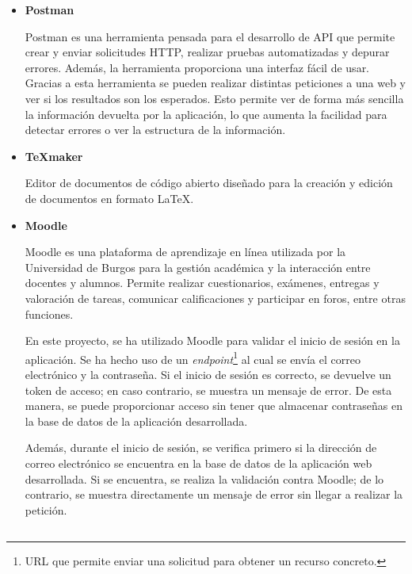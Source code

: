 \begin{itemize}
\item\textbf{Postman}

Postman es una herramienta pensada para el desarrollo de API que permite crear y enviar solicitudes HTTP, realizar pruebas automatizadas y depurar errores.
Además, la herramienta proporciona una interfaz fácil de usar.
Gracias a esta herramienta se pueden realizar distintas peticiones a una web y ver si los resultados son los esperados.
Esto permite ver de forma más sencilla la información devuelta por la aplicación, lo que aumenta la facilidad para detectar errores o ver la estructura de la información.

\item\textbf{\TeX{}maker}

Editor de documentos de código abierto diseñado para la creación y edición de documentos en formato \LaTeX.

\item\textbf{Moodle}

Moodle es una plataforma de aprendizaje en línea utilizada por la Universidad de Burgos para la gestión académica y la interacción entre docentes y alumnos. Permite realizar cuestionarios, exámenes, entregas y valoración de tareas, comunicar calificaciones y participar en foros, entre otras funciones.

En este proyecto, se ha utilizado Moodle para validar el inicio de sesión en la aplicación. 
Se ha hecho uso de un \textit{endpoint}\footnote{URL que permite enviar una solicitud para obtener un recurso concreto.} al cual se envía el correo electrónico y la contraseña. 
Si el inicio de sesión es correcto, se devuelve un token de acceso; en caso contrario, se muestra un mensaje de error. 
De esta manera, se puede proporcionar acceso sin tener que almacenar contraseñas en la base de datos de la aplicación desarrollada.

Además, durante el inicio de sesión, se verifica primero si la dirección de correo electrónico se encuentra en la base de datos de la aplicación web desarrollada. Si se encuentra, se realiza la validación contra Moodle; de lo contrario, se muestra directamente un mensaje de error sin llegar a realizar la petición.

\end{itemize}
\subsection{}
